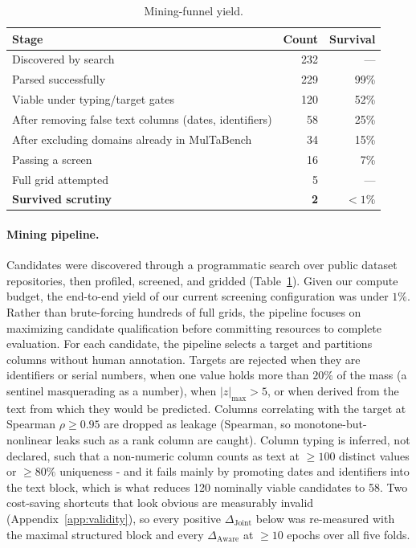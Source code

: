 \documentclass{article}
\newcommand{\djoint}{\Delta_{\text{Joint}}}
\newcommand{\daware}{\Delta_{\text{Aware}}}
\begin{document}
\begin{table}[t]
\centering
\small
\caption{Mining-funnel yield.} 
\label{tab:funnel}
\begin{tabular}{lrr}
\toprule
Stage & Count & Survival \\
\midrule
Discovered by search & 232 & --- \\
Parsed successfully & 229 & 99\% \\
Viable under typing/target gates & 120 & 52\% \\
After removing false text columns (dates, identifiers) & 58 & 25\% \\
After excluding domains already in MulTaBench & 34 & 15\% \\
Passing a screen & 16 & 7\% \\
Full grid attempted & 5 & --- \\
\textbf{Survived scrutiny} & \textbf{2} & \textbf{$<1\%$} \\
\bottomrule
\end{tabular}
\end{table}



\paragraph{Mining pipeline.} 
Candidates were discovered through a programmatic search over public dataset repositories, then profiled, screened, and gridded (Table~\ref{tab:funnel}). Given our compute budget, the end-to-end yield of our current screening configuration was under $1\%$. Rather than brute-forcing hundreds of full grids, the pipeline focuses on maximizing candidate qualification before committing resources to complete evaluation.
For each candidate, the pipeline selects a target and partitions columns without
human annotation. Targets are rejected when they are identifiers or serial numbers, when one
value holds more than $20\%$ of the mass (a sentinel masquerading as a number), when
$|z|_{\max} > 5$, or when derived from the text from which they would be predicted. Columns
correlating with the target at Spearman $\rho \ge 0.95$ are dropped as leakage (Spearman, so
monotone-but-nonlinear leaks such as a rank column are caught). Column typing is inferred, not
declared, such that a non-numeric column counts as text at $\ge 100$ distinct values or $\ge 80\%$
uniqueness - and it fails mainly by promoting dates and identifiers into the text block,
which is what reduces 120 nominally viable candidates to 58. Two cost-saving shortcuts that
look obvious are measurably invalid (Appendix~\ref{app:validity}), so every positive $\djoint$
below was re-measured with the maximal structured block and every $\daware$ at $\ge 10$ epochs
over all five folds.
\end{document}
